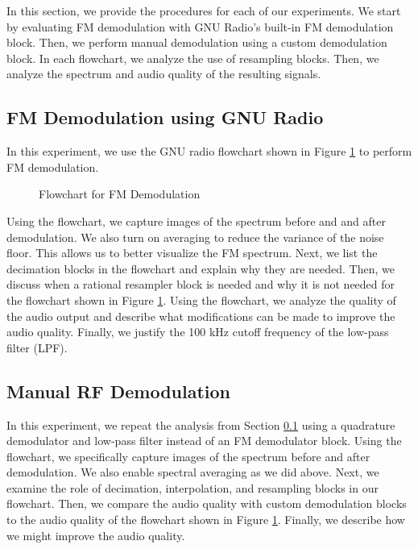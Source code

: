 \documentclass{article}
\begin{document}
In this section, we provide the procedures for each of our experiments. We start by evaluating FM demodulation with GNU Radio's built-in FM demodulation block. Then, we perform manual demodulation using a custom demodulation block. In each flowchart, we analyze the use of resampling blocks. Then, we analyze the spectrum and audio quality of the resulting signals.

\subsection{FM Demodulation using GNU Radio}
\label{section::fm_demod_gnu_radio}

In this experiment, we use the GNU radio flowchart shown in Figure \ref{fig::fm_radio_flowchart} to perform FM demodulation.

\begin{figure}[H]
	\centerline{}
	\caption{Flowchart for FM Demodulation}
	\label{fig::fm_radio_flowchart}
\end{figure}

\noindent Using the flowchart, we capture images of the spectrum before and and after demodulation. We also turn on averaging to reduce the variance of the noise floor. This allows us to better visualize the FM spectrum. Next, we list the decimation blocks in the flowchart and explain why they are needed. Then, we discuss when a rational resampler block is needed and why it is not needed for the flowchart shown in Figure \ref{fig::fm_radio_flowchart}. Using the flowchart, we analyze the quality of the audio output and describe what modifications can be made to improve the audio quality. Finally, we justify the 100 kHz cutoff frequency of the low-pass filter (LPF).

\subsection{Manual RF Demodulation}

In this experiment, we repeat the analysis from Section \ref{section::fm_demod_gnu_radio} using a quadrature demodulator and low-pass filter instead of an FM demodulator block. Using the flowchart, we specifically capture images of the spectrum before and after demodulation. We also enable spectral averaging as we did above. Next, we examine the role of decimation, interpolation, and resampling blocks in our flowchart. Then, we compare the audio quality with custom demodulation blocks to the audio quality of the flowchart shown in Figure \ref{fig::fm_radio_flowchart}. Finally, we describe how we might improve the audio quality.
\end{document}
